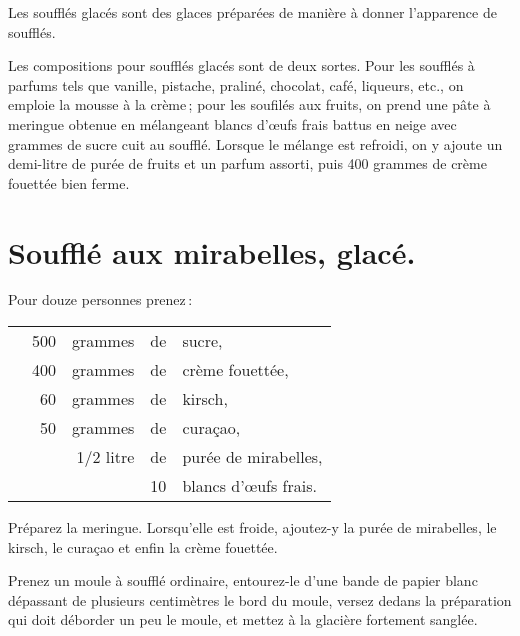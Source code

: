 \bigskip


Les soufflés glacés sont des glaces préparées de manière à donner l'apparence
de soufflés.

Les compositions pour soufflés glacés sont de deux sortes. Pour les soufflés
à parfums tels que vanille, pistache, praliné, chocolat, café, liqueurs, etc.,
on emploie la mousse à la crème ; pour les soufilés aux fruits, on prend une
pâte à meringue obtenue en mélangeant {\mmm} blancs d'œufs frais battus
en neige avec {\mmm} grammes de sucre cuit au soufflé. Lorsque le
mélange est refroidi, on y ajoute un demi-litre de purée de fruits et un parfum
assorti, puis 400 grammes de crème fouettée bien ferme.

\section*{\centering Soufflé aux mirabelles, glacé.}
{}

Pour douze personnes prenez :

\footnotesize
\begin{longtable}{rrrrp{16em}}
  & 500 & grammes   & de & sucre,                                                                         \\
  & 400 & grammes   & de & crème fouettée,                                                                \\
  &  60 & grammes   & de & kirsch,                                                                        \\
  &  50 & grammes   & de & curaçao,                                                                       \\
  & \multicolumn{2}{r}{1/2 litre} & de & purée de mirabelles,                                             \\
  &     &           & 10 & blancs d'œufs frais.                                                           \\
\end{longtable}
\normalsize

Préparez la meringue. Lorsqu'elle est froide, ajoutez-y la purée de mirabelles,
le kirsch, le curaçao et enfin la crème fouettée.

Prenez un moule à soufflé ordinaire, entourez-le d'une bande de papier blanc
dépassant de plusieurs centimètres le bord du moule, versez dedans la
préparation qui doit déborder un peu le moule, et mettez à la glacière
fortement sanglée.


